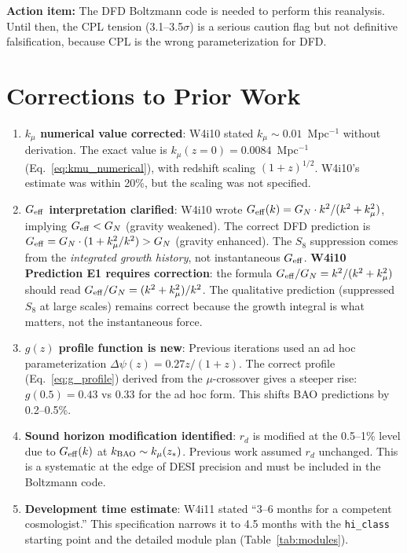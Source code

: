 \documentclass[11pt,a4paper]{article}
\newcommand{\kmu}{k_\mu}
\newcommand{\Geff}{G_{\rm eff}}
\newcommand{\hiclass}{\texttt{hi\_class}}
\begin{document}
\textbf{Action item:} The DFD Boltzmann code is needed to perform
this reanalysis. Until then, the CPL tension
(3.1--3.5$\sigma$) is a serious caution flag but not definitive
falsification, because CPL is the wrong parameterization for DFD.


\section{Corrections to Prior Work}
\label{sec:corrections}

\begin{enumerate}
\item \textbf{$\kmu$ numerical value corrected}: W4i10 stated
  $\kmu \sim 0.01$~Mpc$^{-1}$ without derivation. The exact value
  is $\kmu(z=0) = 0.0084$~Mpc$^{-1}$ (Eq.~\eqref{eq:kmu_numerical}),
  with redshift scaling $(1+z)^{1/2}$. W4i10's estimate was within
  20\%, but the scaling was not specified.

\item \textbf{$\Geff$ interpretation clarified}: W4i10 wrote
  $G_{\rm eff}(k) = G_N \cdot k^2/(k^2 + \kmu^2)$, implying
  $\Geff < G_N$ (gravity weakened). The correct DFD prediction is
  $\Geff = G_N \cdot (1 + \kmu^2/k^2) > G_N$ (gravity enhanced).
  The $S_8$ suppression comes from the \emph{integrated growth history},
  not instantaneous $\Geff$.
  \textbf{W4i10 Prediction E1 requires correction}: the formula
  $G_{\rm eff}/G_N = k^2/(k^2 + \kmu^2)$ should read
  $G_{\rm eff}/G_N = (k^2 + \kmu^2)/k^2$. The qualitative prediction
  (suppressed $S_8$ at large scales) remains correct because the
  growth integral is what matters, not the instantaneous force.

\item \textbf{$g(z)$ profile function is new}: Previous iterations
  used an ad hoc parameterization $\Delta\psi(z) = 0.27 z/(1+z)$.
  The correct profile (Eq.~\eqref{eq:g_profile}) derived from the
  $\mu$-crossover gives a steeper rise: $g(0.5) = 0.43$ vs $0.33$
  for the ad hoc form. This shifts BAO predictions by 0.2--0.5\%.

\item \textbf{Sound horizon modification identified}: $r_d$ is
  modified at the 0.5--1\% level due to $\Geff(k)$ at
  $k_{\rm BAO} \sim \kmu(z_*)$. Previous work assumed $r_d$ unchanged.
  This is a systematic at the edge of DESI precision and must be
  included in the Boltzmann code.

\item \textbf{Development time estimate}: W4i11 stated ``3--6 months
  for a competent cosmologist.'' This specification narrows it to
  4.5 months with the \hiclass{} starting point and the detailed
  module plan (Table~\ref{tab:modules}).
\end{enumerate}
\end{document}
